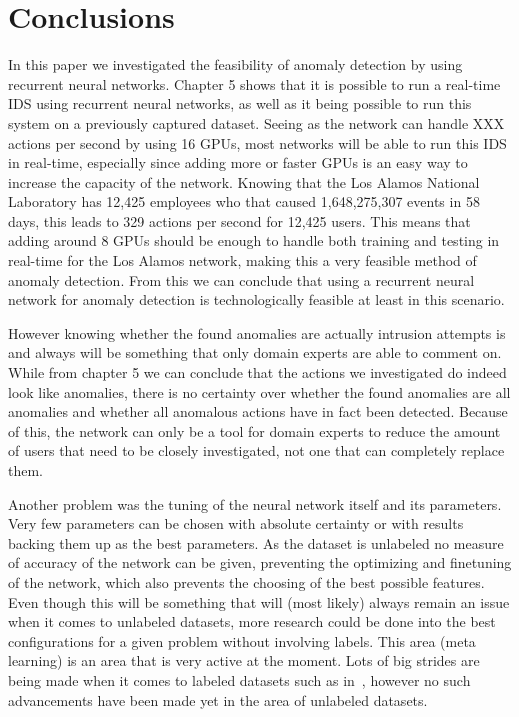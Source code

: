 \chapter{Conclusions}\label{ch:conclusions}

In this paper we investigated the feasibility of anomaly detection by using recurrent neural networks. Chapter 5 shows that it is possible to run a real-time IDS using recurrent neural networks, as well as it being possible to run this system on a previously captured dataset. Seeing as the network can handle XXX actions per second by using 16 GPUs, most networks will be able to run this IDS in real-time, especially since adding more or faster GPUs is an easy way to increase the capacity of the network. Knowing that the Los Alamos National Laboratory has 12,425 employees who that caused 1,648,275,307 events in 58 days, this leads to 329 actions per second for 12,425 users. This means that adding around 8 GPUs should be enough to handle both training and testing in real-time for the Los Alamos network, making this a very feasible method of anomaly detection. From this we can conclude that using a recurrent neural network for anomaly detection is technologically feasible at least in this scenario. 

However knowing whether the found anomalies are actually intrusion attempts is and always will be something that only domain experts are able to comment on. While from chapter 5 we can conclude that the actions we investigated do indeed look like anomalies, there is no certainty over whether the found anomalies are all anomalies and whether all anomalous actions have in fact been detected. Because of this, the network can only be a tool for domain experts to reduce the amount of users that need to be closely investigated, not one that can completely replace them. 

Another problem was the tuning of the neural network itself and its parameters. Very few parameters can be chosen with absolute certainty or with results backing them up as the best parameters. As the dataset is unlabeled no measure of accuracy of the network can be given, preventing the optimizing and finetuning of the network, which also prevents the choosing of the best possible features. Even though this will be something that will (most likely) always remain an issue when it comes to unlabeled datasets, more research could be done into the best configurations for a given problem without involving labels. This area (meta learning) is an area that is very active at the moment. Lots of big strides are being made when it comes to labeled datasets such as in~\cite{zoph2016neural}, however no such advancements have been made yet in the area of unlabeled datasets.
